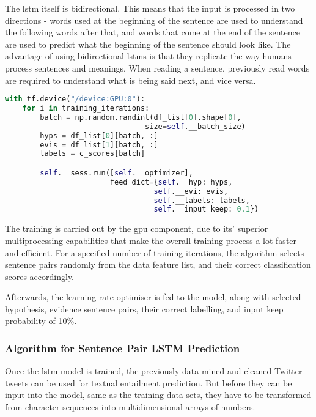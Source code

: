             The \gls{lstm} itself is bidirectional. This means that the input is processed in two directions - words used at the beginning of the sentence are used to understand the following words after that, and words that come at the end of the sentence are used to predict what the beginning of the sentence should look like. The advantage of using bidirectional \gls{lstm}s is that they replicate the way humans process sentences and meanings. When reading a sentence, previously read words are required to understand what is being said next, and vice versa.
            
            \begin{lstlisting}[language=Python, caption=LSTM Training Algorithm, label=code:lstmtraining]
with tf.device("/device:GPU:0"):
    for i in training_iterations:
        batch = np.random.randint(df_list[0].shape[0], 
                                size=self.__batch_size)
        hyps = df_list[0][batch, :]
        evis = df_list[1][batch, :]
        labels = c_scores[batch]

        self.__sess.run([self.__optimizer], 
                        feed_dict={self.__hyp: hyps,
                                  self.__evi: evis,
                                  self.__labels: labels,
                                  self.__input_keep: 0.1})
            \end{lstlisting}
        
            The training is carried out by the \gls{gpu} component, due to its' superior multiprocessing capabilities that make the overall training process a lot faster and efficient. For a specified number of training iterations, the algorithm selects sentence pairs randomly from the data feature list, and their correct classification scores accordingly.
            
            Afterwards, the learning rate optimiser is fed to the model, along with selected hypothesis, evidence sentence pairs, their correct labelling, and input keep probability of 10\%.
            
        \subsubsection{Algorithm for Sentence Pair LSTM Prediction}
            Once the \gls{lstm} model is trained, the previously data mined and cleaned Twitter tweets can be used for textual entailment prediction. But before they can be input into the model, same as the training data sets, they have to be transformed from character sequences into multidimensional arrays of numbers.
            

